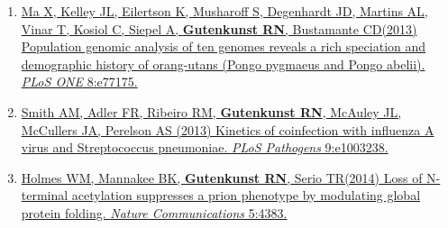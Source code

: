 \documentclass[11pt]{article}
\begin{document}
\begin{enumerate}
\item \href{http://doi.org/10.1371/journal.pone.0077175}{Ma X, Kelley JL, Eilertson K, Musharoff S, Degenhardt JD, Martins AL, Vinar T, Kosiol C, Siepel A, \textbf{Gutenkunst RN}, Bustamante CD\corresponding (2013) Population genomic analysis of ten genomes reveals a rich speciation and demographic history of orang-utans (Pongo pygmaeus and Pongo abelii). \emph{PLoS ONE} 8:e77175.}


\item
\href{http://doi.org/10.1371/journal.ppat.1003238}{Smith AM\corresponding, Adler FR, Ribeiro RM, \textbf{Gutenkunst RN}, McAuley JL, McCullers JA, Perelson AS (2013) Kinetics of coinfection with influenza A virus and Streptococcus pneumoniae. \emph{PLoS Pathogens} 9:e1003238.}


\item \href{http://doi.org/10.1038/ncomms5383}{Holmes WM, Mannakee BK\trainee, \textbf{Gutenkunst RN}, Serio TR\corresponding (2014) Loss of N-terminal acetylation suppresses a prion phenotype by modulating global protein folding. \emph{Nature Communications} 5:4383.}


\end{enumerate}
\end{document}
